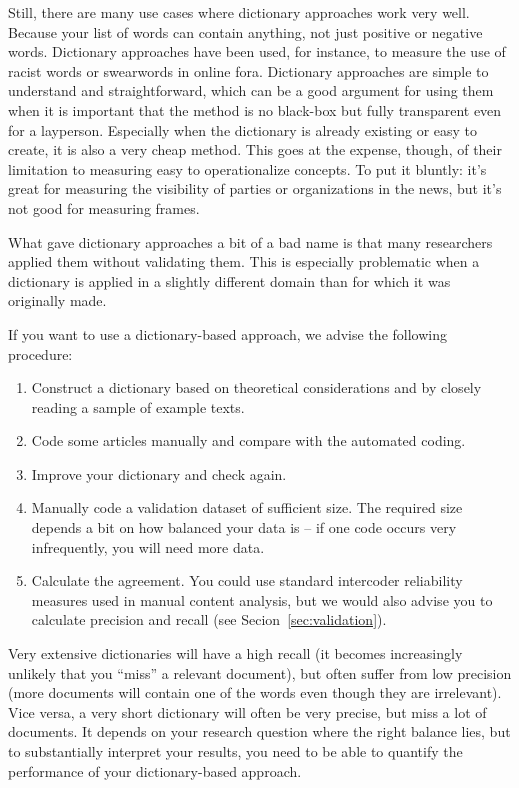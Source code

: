 Still, there are many use cases where dictionary approaches work very
well. Because your list of words can contain anything, not just
positive or negative words. Dictionary approaches have been used, for
instance, to measure the use of racist words or swearwords in online
fora. Dictionary approaches are simple to understand and
straightforward, which can be a good argument for using them when it
is important that the method is no black-box but fully transparent
even for a layperson. Especially when the dictionary is already
existing or easy to create, it is also a very cheap method. This goes
at the expense, though, of their limitation to measuring easy to
operationalize concepts. To put it bluntly: it's great for measuring
the visibility of parties or organizations in the news, but it's not
good for measuring frames.

What gave dictionary approaches a bit of a bad name is that many
researchers applied them without validating them. This is especially
problematic when a dictionary is applied in a slightly different
domain than for which it was originally made.

If you want to use a dictionary-based approach, we advise the
following procedure:

\begin{enumerate}
  \item Construct a dictionary based on theoretical considerations and by closely reading a sample of example texts.
  \item Code some articles manually and compare with the automated coding.
  \item Improve your dictionary and check again.
  \item Manually code a validation dataset of sufficient size. The required size depends a bit on how balanced your data is -- if one code occurs very infrequently, you will need more data.
  \item Calculate the agreement. You could use standard intercoder reliability measures used in manual content analysis, but we would also advise you to calculate precision and recall (see Secion~\ref{sec:validation}).
  \end{enumerate}

Very extensive dictionaries will have a high recall (it becomes
increasingly unlikely that you ``miss'' a relevant document), but
often suffer from low precision (more documents will contain one of
the words even though they are irrelevant). Vice versa, a very short
dictionary will often be very precise, but miss a lot of documents.
It depends on your research question where the right balance lies, but
to substantially interpret your results, you need to be able to
quantify the performance of your dictionary-based approach.
